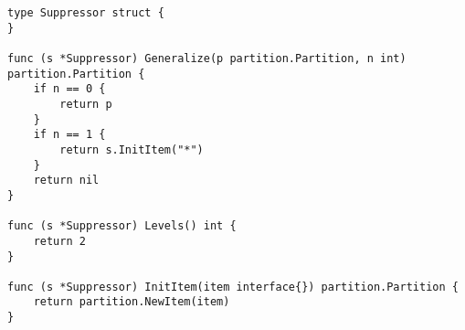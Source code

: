 \begin{lstlisting}[caption=Suppresor implementation,label=lst:suppressor,float,floatplacement=H]
type Suppressor struct {
}

func (s *Suppressor) Generalize(p partition.Partition, n int) partition.Partition {
    if n == 0 {
        return p
    }
    if n == 1 {
        return s.InitItem("*")
    }
    return nil
}

func (s *Suppressor) Levels() int {
    return 2
}

func (s *Suppressor) InitItem(item interface{}) partition.Partition {
    return partition.NewItem(item)
}
\end{lstlisting}